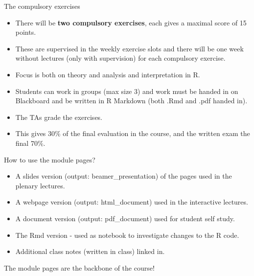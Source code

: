 \documentclass[10pt,ignorenonframetext,]{beamer}
\providecommand{\tightlist}{%
  \setlength{\itemsep}{0pt}\setlength{\parskip}{0pt}}
\begin{document}
\begin{frame}

\begin{block}{The compulsory exercises}

\begin{itemize}
\tightlist
\item
  There will be \textbf{two compulsory exercises}, each gives a maximal
  score of 15 points.
\item
  These are supervised in the weekly exercise slots and there will be
  one week without lectures (only with supervision) for each compulsory
  exercise.
\item
  Focus is both on theory and analysis and interpretation in R.
\item
  Students can work in groups (max size 3) and work must be handed in on
  Blackboard and be written in R Markdown (both .Rmd and .pdf handed
  in).
\item
  The TAs grade the exercises.
\item
  This gives 30\% of the final evaluation in the course, and the written
  exam the final 70\%.
\end{itemize}

\end{block}

\end{frame}

\begin{frame}

\begin{block}{How to use the module pages?}

\begin{itemize}
\tightlist
\item
  A slides version (output: beamer\_presentation) of the pages used in
  the plenary lectures.
\item
  A webpage version (output: html\_document) used in the interactive
  lectures.
\item
  A document version (output: pdf\_document) used for student self
  study.
\item
  The Rmd version - used as notebook to investigate changes to the R
  code.
\item
  Additional class notes (written in class) linked in.
\end{itemize}

The module pages are the backbone of the course!

\end{block}

\end{frame}
\end{document}
